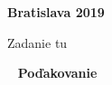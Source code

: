 
\vfill
\noindent
{\bf Bratislava 2019}  \hfill {\bf \autor}
\thispagestyle{empty}

\newpage
\thispagestyle{empty}
\vspace*{-50px}\hspace*{-140px}
Zadanie tu

\newpage
{~}\vfill
{\noindent\large\bf Poďakovanie} 
\vspace{1.5cm}

\vspace{1cm}

\newpage
